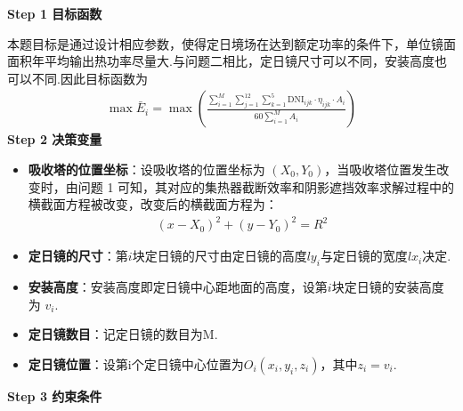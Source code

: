 \documentclass[../main.tex]{subfiles}
\begin{document}
 \noindent \textbf{Step 1 目标函数}
  \par 本题目标是通过设计相应参数，使得定日境场在达到额定功率的条件下，单位镜面面积年平均输出热功率尽量大.与问题二相比，定日镜尺寸可以不同，安装高度也可以不同.因此目标函数为
  \begin{align}\label{2.1}
    \max \bar{E}_i = \max\left(\frac{\sum_{i=1}^{M} \sum_{j=1}^{12} \sum_{k=1}^{5} \text{DNI}_{ijk} \cdot \eta_{ijk} \cdot A_i}{60 \sum_{i=1}^{M} A_i}\right)
  \end{align}
  \noindent \textbf{Step 2 决策变量}
   \begin{itemize}
  \item \textbf{吸收塔的位置坐标}：设吸收塔的位置坐标为 \((X_0, Y_0)\)，当吸收塔位置发生改变时，由问题 1 可知，其对应的集热器截断效率和阴影遮挡效率求解过程中的横截面方程被改变，改变后的横截面方程为：
  \begin{align}\label{2.2}
    (x - X_0)^2 + (y - Y_0)^2 = R^2
  \end{align}
  \item \textbf{定日镜的尺寸}：第$i$块定日镜的尺寸由定日镜的高度\(ly_i\)与定日镜的宽度\(lx_i\)决定.
  \item \textbf{安装高度}：安装高度即定日镜中心距地面的高度，设第$i$块定日镜的安装高度为 \(v_i\).
  \item \textbf{定日镜数目}：记定日镜的数目为M.
  \item \textbf{定日镜位置}：设第i个定日镜中心位置为$O_{i}(x_i,y_i,z_i)$，其中$z_i=v_i$.
  \end{itemize}
\noindent \textbf{Step 3 约束条件}
\end{document}
